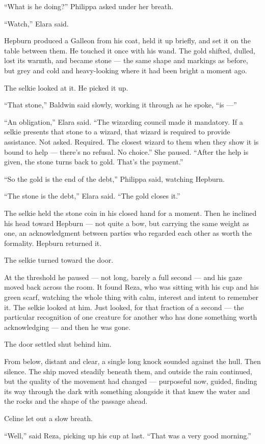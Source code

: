 \enquote{What is he doing?} Philippa asked under her breath.

\enquote{Watch,} Elara said.

Hepburn produced a Galleon from his coat, held it up briefly, and set it on the table between them. He touched it once with his wand. The gold shifted, dulled, lost its warmth, and became stone --- the same shape and markings as before, but grey and cold and heavy-looking where it had been bright a moment ago.

The selkie looked at it. He picked it up.

\enquote{That stone,} Baldwin said slowly, working it through as he spoke, \enquote{is ---}

\enquote{An obligation,} Elara said. \enquote{The wizarding council made it mandatory. If a selkie presents that stone to a wizard, that wizard is required to provide assistance. Not asked. Required. The closest wizard to them when they show it is bound to help --- there's no refusal. No choice.} She paused. \enquote{After the help is given, the stone turns back to gold. That's the payment.}

\enquote{So the gold is the end of the debt,} Philippa said, watching Hepburn.

\enquote{The stone is the debt,} Elara said. \enquote{The gold closes it.}

The selkie held the stone coin in his closed hand for a moment. Then he inclined his head toward Hepburn --- not quite a bow, but carrying the same weight as one, an acknowledgment between parties who regarded each other as worth the formality. Hepburn returned it.

The selkie turned toward the door.

At the threshold he paused --- not long, barely a full second --- and his gaze moved back across the room. It found Reza, who was sitting with his cup and his green scarf, watching the whole thing with calm, interest and intent to remember it. The selkie looked at him. Just looked, for that fraction of a second --- the particular recognition of one creature for another who has done something worth acknowledging --- and then he was gone.

The door settled shut behind him.

From below, distant and clear, a single long knock sounded against the hull. Then silence. The ship moved steadily beneath them, and outside the rain continued, but the quality of the movement had changed --- purposeful now, guided, finding its way through the dark with something alongside it that knew the water and the rocks and the shape of the passage ahead.

Celine let out a slow breath.

\enquote{Well,} said Reza, picking up his cup at last. \enquote{That was a very good morning.}
